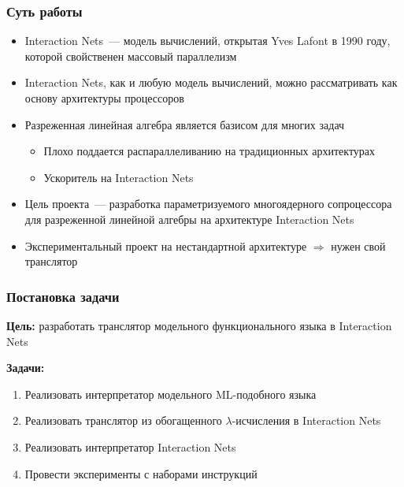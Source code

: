 \documentclass{vkr-slides-style}
\begin{document}
\makeslidestitle

\begin{frame}
    \frametitle{Суть работы}
    \begin{itemize}
        \item<+-> Interaction Nets~--- модель вычислений, открытая Yves Lafont в 1990 году, которой свойственен массовый параллелизм
        \item<+-> Interaction Nets, как и любую модель вычислений, можно рассматривать как основу архитектуры процессоров
        \item<+-> Разреженная линейная алгебра является базисом для многих задач
              \begin{itemize}
                  \item[\faFrownO] Плохо поддается распараллеливанию на традиционных архитектурах
                  \item[\faLightbulbO] Ускоритель на Interaction Nets
              \end{itemize}
        \item<+-> Цель проекта~--- разработка параметризуемого многоядерного сопроцессора для разреженной линейной алгебры на архитектуре Interaction Nets
        \item<+-> Экспериментальный проект на нестандартной архитектуре $\Rightarrow$ нужен свой транслятор
    \end{itemize}
\end{frame}

\begin{frame}
    \frametitle{Постановка задачи}
    \textbf{Цель:} разработать транслятор модельного функционального языка в Interaction Nets

    \vspace{5mm}
    \textbf{Задачи:}
    \begin{enumerate}
        \item Реализовать интерпретатор модельного ML-подобного языка
        \item Реализовать транслятор из обогащенного $\lambda$-исчисления в Interaction Nets
        \item Реализовать интерпретатор Interaction Nets
        \item Провести эксперименты с наборами инструкций
    \end{enumerate}
\end{frame}
\end{document}
